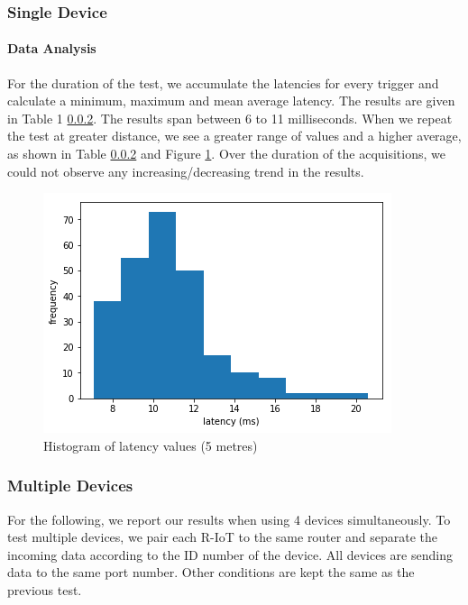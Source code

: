 \subsubsection{Single Device}

\paragraph{Data Analysis}
For the duration of the test, we accumulate the latencies for every trigger and calculate a minimum, maximum and mean average latency. The results are given in Table 1 \ref{}. The results span between 6 to 11 milliseconds. When we repeat the test at greater distance, we see a greater range of values and a higher average, as shown in Table \ref{} and Figure \ref{fig:latency_fig3}. Over the duration of the acquisitions, we could not observe any increasing/decreasing trend in the results.


\begin{figure}[ht]
  \centering
    \includegraphics[width=\textwidth]{Chapters/Figures/technical/Latency/figure3.png}
    \caption{Histogram of latency values (5 metres)}
    \label{fig:latency_fig3}
\end{figure}

\subsubsection{Multiple Devices}

For the following, we report our results when using 4 devices simultaneously. To test multiple devices, we pair each R-IoT to the same router and separate the incoming data according to the ID number of the device. All devices are sending data to the same port number. Other conditions are kept the same as the previous test.

